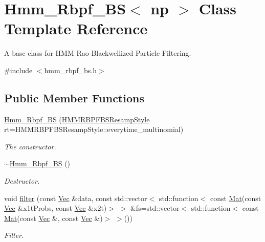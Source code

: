 \hypertarget{classHmm__Rbpf__BS}{}\section{Hmm\+\_\+\+Rbpf\+\_\+\+BS$<$ np $>$ Class Template Reference}
\label{classHmm__Rbpf__BS}


A base-\/class for H\+MM Rao-\/\+Blackwellized Particle Filtering.  




{\ttfamily \#include $<$hmm\+\_\+rbpf\+\_\+bs.\+h$>$}

\subsection*{Public Member Functions}
\begin{DoxyCompactItemize}
\item 
\hyperlink{classHmm__Rbpf__BS_a7485e9b843711f9918dab590f4a2a948}{Hmm\+\_\+\+Rbpf\+\_\+\+BS} (\hyperlink{hmm__rbpf__bs_8h_aa825de46e9871700dd4b7e971a6b3baf}{H\+M\+M\+R\+B\+P\+F\+B\+S\+Resamp\+Style} rt=H\+M\+M\+R\+B\+P\+F\+B\+S\+Resamp\+Style\+::everytime\+\_\+multinomial)
\begin{DoxyCompactList}\small\item\em The constructor. \end{DoxyCompactList}\item 
\hyperlink{classHmm__Rbpf__BS_ab6fd74f1fc21042153f9cf889e229c21}{$\sim$\+Hmm\+\_\+\+Rbpf\+\_\+\+BS} ()
\begin{DoxyCompactList}\small\item\em Destructor. \end{DoxyCompactList}\item 
void \hyperlink{classHmm__Rbpf__BS_a6bed7b232c521446c8ff17b227953b52}{filter} (const \hyperlink{apf__filter_8h_a4c7df05c6f5e8a0d15ae14bcdbc07152}{Vec} \&data, const std\+::vector$<$ std\+::function$<$ const \hyperlink{apf__filter_8h_ae601f56a556993079f730483c574356f}{Mat}(const \hyperlink{apf__filter_8h_a4c7df05c6f5e8a0d15ae14bcdbc07152}{Vec} \&x1t\+Probs, const \hyperlink{apf__filter_8h_a4c7df05c6f5e8a0d15ae14bcdbc07152}{Vec} \&x2t)$>$ $>$ \&fs=std\+::vector$<$ std\+::function$<$ const \hyperlink{apf__filter_8h_ae601f56a556993079f730483c574356f}{Mat}(const \hyperlink{apf__filter_8h_a4c7df05c6f5e8a0d15ae14bcdbc07152}{Vec} \&, const \hyperlink{apf__filter_8h_a4c7df05c6f5e8a0d15ae14bcdbc07152}{Vec} \&)$>$ $>$())
\begin{DoxyCompactList}\small\item\em Filter. \end{DoxyCompactList}\item 

\end{DoxyCompactItemize}
